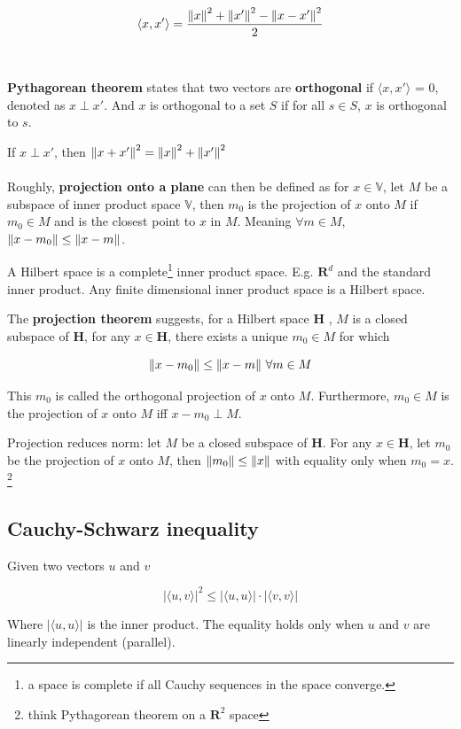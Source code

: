 \documentclass{article}
\begin{document}
$$
\langle x , x' \rangle = \frac{\norm{x}^2 + \norm{x'}^2 - \norm{x - x'}^2}{2}
$$
\\
\\
\textbf{Pythagorean theorem} states that two vectors are \textbf{orthogonal} if $\langle x , x' \rangle$ = 0, denoted as $x \perp x'$.
And $x$ is orthogonal to a set $S$ if for all $s \in S$, $x$ is orthogonal to $s$.

If $x \perp x'$, then $\norm{x + x'}^2 = \norm{x}^2 + \norm{x'}^2$
\\
\\
Roughly, \textbf{projection onto a plane} can then be defined as for $x \in \mathbb{V}$, let $M$ be a subspace of inner product space $\mathbb{V}$, then $m_0$ is the projection of $x$ onto $M$ if $m_0 \in M$ and is the closest point to $x$ in $M$.
Meaning $\forall m \in M$, $\norm{x - m_0} \leq \norm{x - m}$.

A Hilbert space is a complete\footnote{a space is complete if all Cauchy sequences in the space converge.} inner product space.
E.g. $\mathbf{R}^d$ and the standard inner product. Any finite dimensional inner product space is a Hilbert space.

The \textbf{projection theorem} suggests, for a Hilbert space $\mathbf{H}$ , $M$ is a closed subspace of $\mathbf{H}$, for any $x \in \mathbf{H}$, there exists a unique $m_0 \in M$ for which

$$
\norm{x - m_0} \leq \norm{x - m} ~ \forall m \in M
$$

This $m_0$ is called the orthogonal projection of $x$ onto $M$.
Furthermore, $m_0 \in M$ is the projection of $x$ onto $M$ iff $x - m_0 \perp M$.

Projection reduces norm: let $M$ be a closed subspace of $\mathbf{H}$.
For any $x \in \mathbf{H}$, let $m_0$ be the projection of $x$ onto $M$, then $\norm{m_0} \leq \norm{x}$ with equality only when $m_0 = x$. \footnote{think Pythagorean theorem on a $\mathbf{R}^2$ space}

\subsection{Cauchy-Schwarz inequality}

Given two vectors $u$ and $v$

$$
|\langle u , v \rangle|^2 \leq |\langle u , u \rangle| \cdot |\langle v , v \rangle|
$$

Where $|\langle u , u \rangle|$ is the inner product.
The equality holds only when $u$ and $v$ are linearly independent (parallel).
\end{document}
